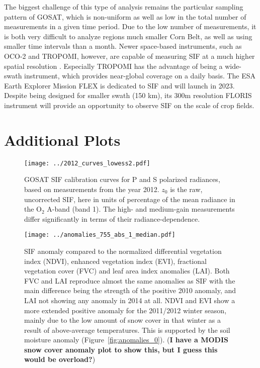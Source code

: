 \documentclass[preprint, a4paper, 10pt, times, 5p]{elsarticle}
\begin{document}
The biggest challenge of this type of analysis remains the particular sampling pattern of GOSAT, which is non-uniform as well as low in the total number of measurements in a given time period. Due to the low number of measurements, it is both very difficult to analyze regions much smaller Corn Belt, as well as using smaller time intervals than a month. Newer space-based instruments, such as OCO-2 and TROPOMI, however, are capable of measuring SIF at a much higher spatial resolution \citep{sun2018overview,kohler2018global}. Especially TROPOMI has the advantage of being a wide-swath instrument, which provides near-global coverage on a daily basis. The ESA Earth Explorer Mission FLEX \citep{drusch2017fluorescence} is dedicated to SIF and will launch in 2023. Despite being designed for smaller swath (150 km), its 300m resolution FLORIS instrument will provide an opportunity to observe SIF on the scale of crop fields. 


\section*{}


\appendix
\section{Additional Plots}


\begin{figure}[htbp]
\centering
\texttt{[image: ../2012\_curves\_lowess2.pdf]}
\caption{GOSAT SIF calibration curves for P and S polarized radiances, based on measurements from the year 2012. $z_0$ is the raw, uncorrected SIF, here in units of percentage of the mean radiance in the O$_2$ A-band (band 1). The high- and medium-gain measurements differ significantly in terms of their radiance-dependence.}
\label{fig:calibration_curves}
\end{figure}



\begin{figure}[htbp]
\centering
\texttt{[image: ../anomalies\_755\_abs\_1\_median.pdf]}
\caption{SIF anomaly compared to the normalized differential vegetation index (NDVI), enhanced vegetation index (EVI), fractional vegetation cover (FVC) and leaf area index anomalies (LAI). Both FVC and LAI reproduce almost the same anomalies as SIF with the main difference being the strength of the positive 2010 anomaly, and LAI not showing any anomaly in 2014 at all. NDVI and EVI show a more extended positive anomaly for the 2011/2012 winter season, mainly due to the low amount of snow cover in that winter as a result of above-average temperatures. This is supported by the soil moisture anomaly (Figure~\ref{fig:anomalies_0}). (\textbf{I have a MODIS snow cover anomaly plot to show this, but I guess this would be overload?})}
\label{fig:anomalies_vi}
\end{figure}
\end{document}
